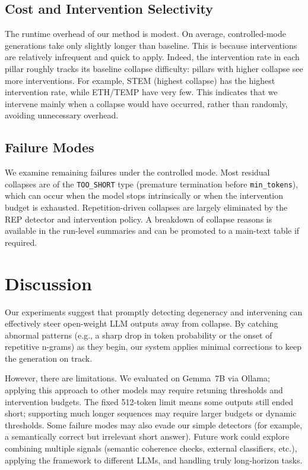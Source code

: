\documentclass{article}
\begin{document}
\subsection{Cost and Intervention Selectivity}
The runtime overhead of our method is modest. On average, controlled-mode generations take only slightly longer than baseline. This is because interventions are relatively infrequent and quick to apply. Indeed, the intervention rate in each pillar roughly tracks its baseline collapse difficulty: pillars with higher collapse see more interventions. For example, STEM (highest collapse) has the highest intervention rate, while ETH/TEMP have very few. This indicates that we intervene mainly when a collapse would have occurred, rather than randomly, avoiding unnecessary overhead.

\subsection{Failure Modes}
We examine remaining failures under the controlled mode. Most residual collapses are of the \texttt{TOO\_SHORT} type (premature termination before \texttt{min\_tokens}), which can occur when the model stops intrinsically or when the intervention budget is exhausted. Repetition-driven collapses are largely eliminated by the REP detector and intervention policy. A breakdown of collapse reasons is available in the run-level summaries and can be promoted to a main-text table if required.

\section{Discussion}
Our experiments suggest that promptly detecting degeneracy and intervening can effectively steer open-weight LLM outputs away from collapse. By catching abnormal patterns (e.g., a sharp drop in token probability or the onset of repetitive n-grams) as they begin, our system applies minimal corrections to keep the generation on track.

However, there are limitations. We evaluated on Gemma~7B via Ollama; applying this approach to other models may require retuning thresholds and intervention budgets. The fixed 512-token limit means some outputs still ended short; supporting much longer sequences may require larger budgets or dynamic thresholds. Some failure modes may also evade our simple detectors (for example, a semantically correct but irrelevant short answer). Future work could explore combining multiple signals (semantic coherence checks, external classifiers, etc.), applying the framework to different LLMs, and handling truly long-horizon tasks.
\end{document}
